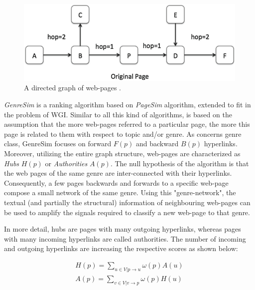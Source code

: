 \begin{figure}[t]
	\begin{center}
    	\includegraphics[scale=0.95]{Figures/GenreSim_Draw.eps}
		\caption{A directed graph of  web-pages \parencite{zhu2016exploiting}.}
		\label{fig:GenreSim_Draw}
	\end{center}
\end{figure}

\textit{GenreSim} is a ranking algorithm based on \textit{PageSim} algorithm, extended to fit in the problem of WGI. Similar to all this kind of algorithms, is based on the assumption that the more web-pages referred to a particular page, the more this page is related to them with respect to topic and/or genre. As concerns genre class, GenreSim focuses on forward $F(p)$ and backward $B(p)$ hyperlinks. Moreover, utilizing the entire graph structure, web-pages are characterized as \textit{Hubs} $H(p)$ or \textit{Authorities} $A(p)$. The null hypothesis of the algorithm is that the web pages of the same genre are inter-connected with their hyperlinks. Consequently, a few pages backwards and forwards to a specific web-page compose a small network of the same genre. Using this "genre-network", the textual (and partially the structural) information of neighbouring web-pages can be used to amplify the signals required to classify a new web-page to that genre.

In more detail, hubs are pages with many outgoing hyperlinks, whereas pages with many incoming hyperlinks are called authorities. The number of incoming and outgoing hyperlinks are increasing the respective scores as shown below:

\begin{equation}\label{eq:GenreSim_hub_authortities}
	\begin{array}{l}
		H(p) = \sum_{u \in V|p \to u} \omega(p) A(u) \\  
    	A(p) = \sum_{v \in V|v \to p} \omega(p) H(u) \\
    \end{array}
\end{equation}

